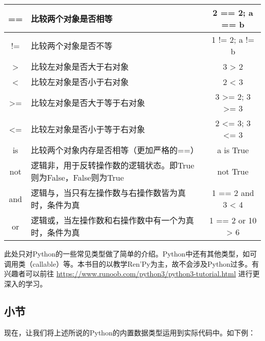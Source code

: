 \documentclass[../../Main.tex]{subfiles}
\begin{document}
\begin{center}
    \tabletail{\hline}
    \tablelasttail{\hline}
    \label{table:4.1.5}
    \begin{supertabular}{|c|p{8cm}|c|}
        \hline
        == & 比较两个对象是否相等 & 2 == 2; a == b\\
        \hline
        != & 比较两个对象是否不等 & 1 != 2; a != b\\
        \hline
        > & 比较左对象是否大于右对象 & 3 > 2\\
        \hline
        < & 比较左对象是否小于右对象 & 2 < 3\\
        \hline
        >= & 比较左对象是否大于等于右对象 & 3 >= 2; 3 >= 3\\
        \hline
        <= & 比较左对象是否小于等于右对象 & 2 <= 3; 3 <= 3\\
        \hline
        is & 比较两个对象内存是否相等（更加严格的==）& a is True\\
        \hline
        not & 逻辑非，用于反转操作数的逻辑状态。即True则为False，False则为True & not True\\
        \hline
        and & 逻辑与，当只有左操作数与右操作数皆为真时，条件为真 & 1 == 2 and 3 < 4\\
        \hline
        or & 逻辑或，当左操作数和右操作数中有一个为真时，条件为真 & 1 == 2 or 10 > 6\\
        \hline
    \end{supertabular}
\end{center}

\begin{ExtraKnowledge}
    此处只对Python的一些常见类型做了简单的介绍。Python中还有其他类型，如可调用类（callable）等。本书目的以教学Ren'Py为主，故不会涉及Python过多。有兴趣者可以前往 \url{https://www.runoob.com/python3/python3-tutorial.html} 进行更深入的学习。
\end{ExtraKnowledge}

\subsection{小节}
现在，让我们将上述所说的Python的内置数据类型运用到实际代码中。如下例：
\end{document}
